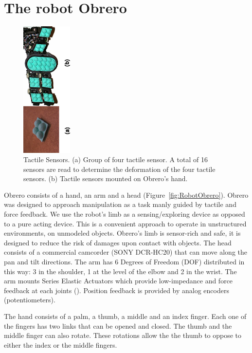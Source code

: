 
\section{The robot Obrero}
\label{sec:platform}


\begin{figure}[tbp]
\centerline{
\includegraphics[width=1.0in, angle=270 ]{./figures/Tactiles.eps}
} \caption{Tactile Sensors. (a) Group of four tactile sensor. A
total of 16 sensors are read to determine the deformation of the
four tactile sensors. (b) Tactile sensors mounted on Obrero's
hand.} \label{fig:TactileSensors}
\end{figure}

Obrero \cite{obrero} consists of a hand, an arm and a head
(Figure~\ref{fig:RobotObrero}). Obrero was designed to approach
manipulation as a task manly guided by tactile and force feedback.
We use the robot's limb as a sensing/exploring device as opposed
to a pure acting device. This is a convenient approach to operate
in unstructured environments, on unmodeled objects. Obrero's limb
is sensor-rich and safe, it is designed to reduce the risk of
damages upon contact with objects. The head consists of a
commercial camcorder (SONY DCR-HC20) that can move along the pan
and tilt directions. The arm has 6 Degrees of Freedom (DOF)
distributed in this way: 3 in the shoulder, 1 at the level of the
elbow and 2 in the wrist. The arm mounts Series Elastic Actuators
\cite{williamson95series} which provide low-impedance and force
feedback at each joints (\cite{domo}). Position feedback is
provided by analog encoders (potentiometers).

The hand consists of a palm, a thumb, a middle and an
index finger. Each one of the fingers has two links that can be
opened and closed. The thumb and the middle finger can also
rotate. These rotations allow the the thumb to oppose to either
the index or the middle fingers.

